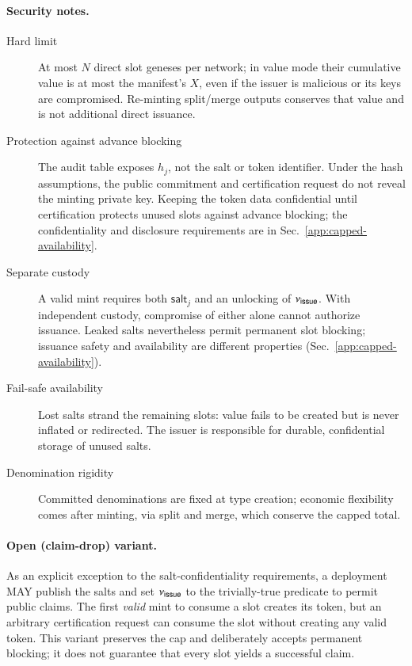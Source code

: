 \paragraph{Security notes.}
\begin{description}
	\item[Hard limit] At most $N$ direct slot geneses per network; in value mode their cumulative value is at most the manifest's $X$, even if the issuer is malicious or its keys are compromised. Re-minting split/merge outputs conserves that value and is not additional direct issuance.
	\item[Protection against advance blocking] The audit table exposes $h_j$, not the salt or token identifier. Under the hash assumptions, the public commitment and certification request do not reveal the minting private key. Keeping the token data confidential until certification protects unused slots against advance blocking; the confidentiality and disclosure requirements are in Sec.~\ref{app:capped-availability}.
	\item[Separate custody] A valid mint requires both $\mathsf{salt}_j$ and an unlocking of $\nu_\mathsf{issue}$. With independent custody, compromise of either alone cannot authorize issuance. Leaked salts nevertheless permit permanent slot blocking; issuance safety and availability are different properties (Sec.~\ref{app:capped-availability}).
	\item[Fail-safe availability] Lost salts strand the remaining slots: value fails to be created but is never inflated or redirected. The issuer is responsible for durable, confidential storage of unused salts.
	\item[Denomination rigidity] Committed denominations are fixed at type creation; economic flexibility comes after minting, via split and merge, which conserve the capped total.
\end{description}

\paragraph{Open (claim-drop) variant.} As an explicit exception to the salt-confidentiality requirements, a deployment MAY publish the salts and set $\nu_\mathsf{issue}$ to the trivially-true predicate to permit public claims. The first \emph{valid} mint to consume a slot creates its token, but an arbitrary certification request can consume the slot without creating any valid token. This variant preserves the cap and deliberately accepts permanent blocking; it does not guarantee that every slot yields a successful claim.

